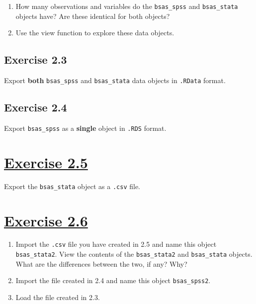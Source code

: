 \documentclass[
]{book}
\providecommand{\tightlist}{%
  \setlength{\itemsep}{0pt}\setlength{\parskip}{0pt}}
\begin{document}
\begin{enumerate}
\def\labelenumi{\alph{enumi}.}
\tightlist
\item
  How many observations and variables do the \texttt{bsas\_spss} and \texttt{bsas\_stata} objects have? Are these identical for both objects?
\item
  Use the view function to explore these data objects.
\end{enumerate}

\hypertarget{exercise-2.3}{%
\subsection{Exercise 2.3}\label{exercise-2.3}}

Export \textbf{both} \texttt{bsas\_spss} and \texttt{bsas\_stata} data objects in \texttt{.RData} format.

\hypertarget{exercise-2.4}{%
\subsection{Exercise 2.4}\label{exercise-2.4}}

Export \texttt{bsas\_spss} as a \textbf{single} object in \texttt{.RDS} format.

\hypertarget{section}{%
\section{\texorpdfstring{\underline{Exercise 2.5}}{}}\label{section}}

Export the \texttt{bsas\_stata} object as a \texttt{.csv} file.

\hypertarget{section-1}{%
\section{\texorpdfstring{\underline{Exercise 2.6}}{}}\label{section-1}}

\begin{enumerate}
\def\labelenumi{\alph{enumi}.}
\tightlist
\item
  Import the \texttt{.csv} file you have created in 2.5 and name this object \texttt{bsas\_stata2}. View the contents of the \texttt{bsas\_stata2} and \texttt{bsas\_stata} objects. What are the differences between the two, if any? Why?
\item
  Import the file created in 2.4 and name this object \texttt{bsas\_spss2}.
\item
  Load the file created in 2.3.
\end{enumerate}
\end{document}
